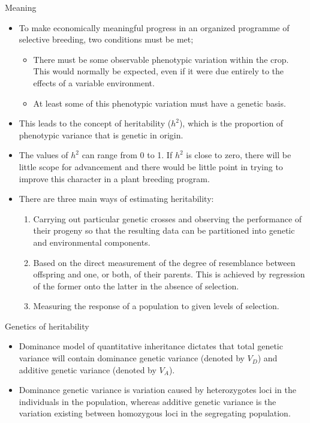 \documentclass[11pt,dvipsnames,ignorenonframetext,aspectratio=169]{beamer}
\providecommand{\tightlist}{%
  \setlength{\itemsep}{0pt}\setlength{\parskip}{0pt}}
\begin{document}
\begin{frame}{Meaning}
\protect\hypertarget{meaning}{}
\begin{itemize}
\tightlist
\item
  To make economically meaningful progress in an organized programme of
  selective breeding, two conditions must be met;

  \begin{itemize}
  \tightlist
  \item
    There must be some observable phenotypic variation within the crop.
    This would normally be expected, even if it were due entirely to the
    effects of a variable environment.
  \item
    At least some of this phenotypic variation must have a genetic
    basis.
  \end{itemize}
\item
  This leads to the concept of heritability (\(h^2\)), which is the
  proportion of phenotypic variance that is genetic in origin.
\item
  The values of \(h^2\) can range from 0 to 1. If \(h^2\) is close to
  zero, there will be little scope for advancement and there would be
  little point in trying to improve this character in a plant breeding
  program.
\item
  There are three main ways of estimating heritability:

  \begin{enumerate}
  \tightlist
  \item
    Carrying out particular genetic crosses and observing the
    performance of their progeny so that the resulting data can be
    partitioned into genetic and environmental components.
  \item
    Based on the direct measurement of the degree of resemblance between
    offspring and one, or both, of their parents. This is achieved by
    regression of the former onto the latter in the absence of
    selection.
  \item
    Measuring the response of a population to given levels of selection.
  \end{enumerate}
\end{itemize}
\end{frame}

\begin{frame}{Genetics of heritability}
\protect\hypertarget{genetics-of-heritability}{}
\begin{itemize}
\tightlist
\item
  Dominance model of quantitative inheritance dictates that total
  genetic variance will contain dominance genetic variance (denoted by
  \(V_D\)) and additive genetic variance (denoted by \(V_A\)).
\item
  Dominance genetic variance is variation caused by heterozygotes loci
  in the individuals in the population, whereas additive genetic
  variance is the variation existing between homozygous loci in the
  segregating population.
\end{itemize}
\end{frame}
\end{document}
